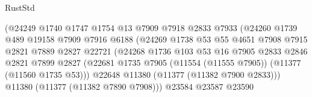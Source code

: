 \begin{lexlean}{RustStd}
\begin{coremodule}
                                      (@24249
                                        @1740
                                        @1747
                                        @1754
                                        @13
                                        @7909
                                        @7918
                                        @2833
                                        @7933
                                        (@24260
                                          @1739
                                          @489
                                          @19158
                                          @7909
                                          @7916
                                          @6188
                                          (@24269
                                            @1738
                                            @53
                                            @55
                                            @4651
                                            @7908
                                            @7915
                                            @2821
                                            @7889
                                            @2827
                                            @22721
                                            (@24268
                                              @1736
                                              @103
                                              @53
                                              @16
                                              @7905
                                              @2833
                                              @2846
                                              @2821
                                              @7899
                                              @2827
                                              (@22681
                                                @1735
                                                @7905
                                                (@11554 (@11555 @7905))
                                                (@11377 (@11560 @1735 @53)))
                                              @22648
                                              @11380
                                              (@11377 (@11382 @7900 @2833)))
                                            @11380
                                            (@11377 (@11382 @7890 @7908)))
                                          @23584
                                          @23587
                                          @23590

\end{coremodule}
\end{lexlean}
